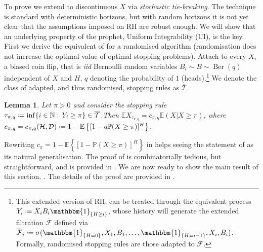 \documentclass[11pt, a4paper, twoside]{article}
\newcommand*{\defeq}{\mathrel{\vcenter{\baselineskip0.5ex \lineskiplimit0pt
			\hbox{\scriptsize.}\hbox{\scriptsize.}}}=}
\newcommand{\NN}{\mathbb{N}}
\newcommand{\EE}{\mathbb{E}}
\newcommand{\PP}{\mathbb{P}}
\newcommand{\BT}{\overline{\mathcal{T}}}
\newcommand{\BF}{\overline{\mathcal{F}}}
\newcommand{\HH}{\mathcal{H}}
\newcommand{\DD}{\mathcal{D}}
\newcommand{\II}{\mathbbm{1}}
\DeclareMathOperator{\Ber}{Ber}
\newtheorem{lemma}{Lemma}[section]
\numberwithin{equation}{section}
\begin{document}
	To prove  we extend  to discontinuous $X$ via \textit{stochastic tie-breaking}. The technique is standard with deterministic horizons, but with random horizons it is not yet clear that the assumptions imposed on RH are robust enough. We will show that an underlying property of the prophet, Uniform Integrability (UI), is the key. First we derive the equivalent of  for a randomised algorithm (randomisation does not increase the optimal value of optimal stopping problems). Attach to every $X_i$ a biased coin flip, that is \textit{iid} Bernoulli random variables $B_i\sim B\sim\Ber(q)$ independent of $X$ and $H$, $q$ denoting the probability of $1$ (heads).\footnote{This extended version of RH, can be treated through the equivalent process $Y_i\defeq X_iB_i\II_{\{H\ge i\}}$, whose history will generate the extended filtration $\BF$ defined via $\BF_i\defeq\sigma(\II_{\{H=0\}},X_1,B_1,\ldots,\II_{\{H=i-1\}},X_i,B_i)$. Formally, randomised stopping rules are those adapted to $\BF$.} We denote the class of adapted, and thus randomised, stopping rules as $\BT$.
	\begin{lemma}\label{algran}
		Let $\pi>0$ and consider the stopping rule $\tau_{\pi,q}\defeq\inf\{i\in\NN:\,Y_i\ge \pi\}\in\BT$.Then $\EE X_{\tau_{\pi,q}}= c_{\pi,q}\EE(X|X\ge \pi)$, where $c_{\pi,q}=c_{\pi,q}(\HH,\DD)\defeq 1-\EE\left\lbrace[1-q\PP(X\ge \pi)]^H\right\rbrace$.
	\end{lemma}
	Rewriting $c_\pi=1-\EE\left\lbrace [1-\PP(X\ge\pi)]^H\right\rbrace$ in  helps seeing the statement of  as its natural generalisation. The proof of  is combinatorially tedious, but straightforward, and is provided in . We are now ready to show the main result of this section, . The details of the proof are provided in .
\end{document}
